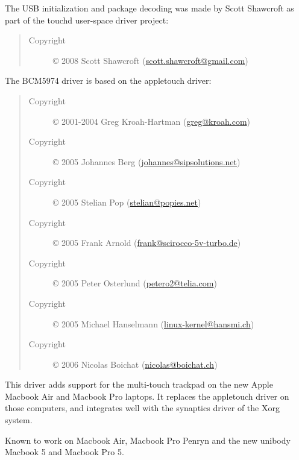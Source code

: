 \documentclass[a4paper,8pt,english]{sphinxmanual}
\begin{document}
The USB initialization and package decoding was made by Scott Shawcroft as
part of the touchd user-space driver project:
\begin{quote}\begin{description}
\item[{Copyright}] \leavevmode
© 2008 Scott Shawcroft (\href{mailto:scott.shawcroft@gmail.com}{scott.shawcroft@gmail.com})

\end{description}\end{quote}

The BCM5974 driver is based on the appletouch driver:
\begin{quote}\begin{description}
\item[{Copyright}] \leavevmode
© 2001-2004    Greg Kroah-Hartman (\href{mailto:greg@kroah.com}{greg@kroah.com})

\item[{Copyright}] \leavevmode
© 2005         Johannes Berg (\href{mailto:johannes@sipsolutions.net}{johannes@sipsolutions.net})

\item[{Copyright}] \leavevmode
© 2005         Stelian Pop (\href{mailto:stelian@popies.net}{stelian@popies.net})

\item[{Copyright}] \leavevmode
© 2005         Frank Arnold (\href{mailto:frank@scirocco-5v-turbo.de}{frank@scirocco-5v-turbo.de})

\item[{Copyright}] \leavevmode
© 2005         Peter Osterlund (\href{mailto:petero2@telia.com}{petero2@telia.com})

\item[{Copyright}] \leavevmode
© 2005         Michael Hanselmann (\href{mailto:linux-kernel@hansmi.ch}{linux-kernel@hansmi.ch})

\item[{Copyright}] \leavevmode
© 2006         Nicolas Boichat (\href{mailto:nicolas@boichat.ch}{nicolas@boichat.ch})

\end{description}\end{quote}

This driver adds support for the multi-touch trackpad on the new Apple
Macbook Air and Macbook Pro laptops. It replaces the appletouch driver on
those computers, and integrates well with the synaptics driver of the Xorg
system.

Known to work on Macbook Air, Macbook Pro Penryn and the new unibody
Macbook 5 and Macbook Pro 5.
\end{document}
